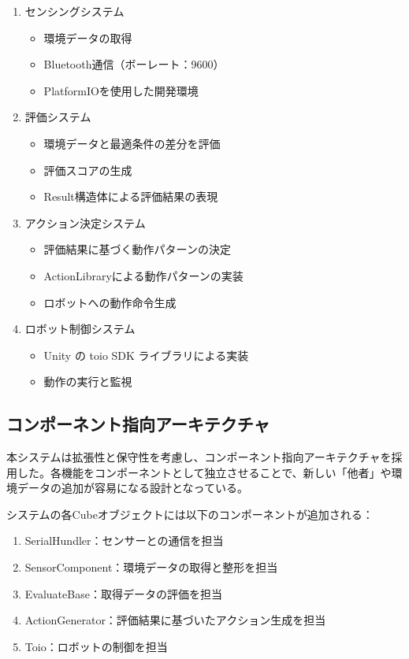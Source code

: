 \documentclass{cuxarticle}
\begin{document}
\begin{enumerate}
  \item センシングシステム
    \begin{itemize}
      \item 環境データの取得
      \item Bluetooth通信（ボーレート：9600）
      \item PlatformIOを使用した開発環境
    \end{itemize}

  \item 評価システム
    \begin{itemize}
      \item 環境データと最適条件の差分を評価
      \item 評価スコアの生成
      \item Result構造体による評価結果の表現
    \end{itemize}

  \item アクション決定システム
    \begin{itemize}
      \item 評価結果に基づく動作パターンの決定
      \item ActionLibraryによる動作パターンの実装
      \item ロボットへの動作命令生成
    \end{itemize}

  \item ロボット制御システム
    \begin{itemize}
      \item Unity の toio SDK ライブラリによる実装
      \item 動作の実行と監視
    \end{itemize}
\end{enumerate}

\subsection{コンポーネント指向アーキテクチャ}
本システムは拡張性と保守性を考慮し、コンポーネント指向アーキテクチャを採用した。各機能をコンポーネントとして独立させることで、新しい「他者」や環境データの追加が容易になる設計となっている。

システムの各Cubeオブジェクトには以下のコンポーネントが追加される：

\begin{enumerate}
  \item SerialHundler：センサーとの通信を担当
  \item SensorComponent：環境データの取得と整形を担当
  \item EvaluateBase：取得データの評価を担当
  \item ActionGenerator：評価結果に基づいたアクション生成を担当
  \item Toio：ロボットの制御を担当
\end{enumerate}
\end{document}
